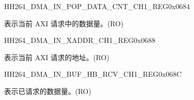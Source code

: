     
    \begin{register}{H}{H264\_DMA\_IN\_POP\_DATA\_CNT\_CH1\_REG}{0x0684}\label{regdesc:H264DMAINPOPDATACNTCH1REG}
    \regnewline%
    \begin{regdesc}\begin{reglist}
    \label{fielddesc:H264DMAINCMDFIFOPOPDATACNTCH1}\item [H264\_DMA\_IN\_CMDFIFO\_POP\_DATA\_CNT\_CH1] 表示当前 AXI 请求中的数据量。(RO)
    \end{reglist}\end{regdesc}
    \end{register}
    
    
    \begin{register}{H}{H264\_DMA\_IN\_XADDR\_CH1\_REG}{0x0688}\label{regdesc:H264DMAINXADDRCH1REG}
    \regnewline%
    \begin{regdesc}\begin{reglist}
    \label{fielddesc:H264DMAINCMDFIFOXADDRCH1}\item [H264\_DMA\_IN\_CMDFIFO\_XADDR\_CH1] 表示当前 AXI 请求的地址。(RO)
    \end{reglist}\end{regdesc}
    \end{register}
    
    
    \begin{register}{H}{H264\_DMA\_IN\_BUF\_HB\_RCV\_CH1\_REG}{0x068C}\label{regdesc:H264DMAINBUFHBRCVCH1REG}
    \regnewline%
    \begin{regdesc}\begin{reglist}
    \label{fielddesc:H264DMAINCMDFIFOBUFHBRCVCH1}\item [H264\_DMA\_IN\_CMDFIFO\_BUF\_HB\_RCV\_CH1] 表示已请求的数据量。(RO)
    \end{reglist}\end{regdesc}
    \end{register}
    

